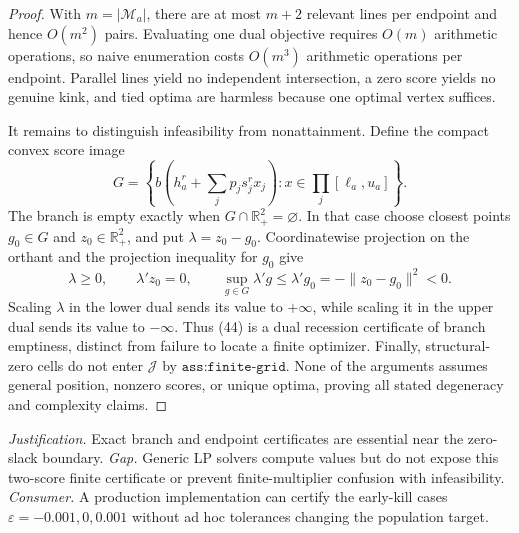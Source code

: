 \documentclass{article}
\begin{document}
\begin{proof}
With \(m=|\mathcal M_a|\), there are at most \(m+2\) relevant lines per endpoint and hence \(O(m^2)\) pairs.  Evaluating one dual objective requires \(O(m)\) arithmetic operations, so naive enumeration costs \(O(m^3)\) arithmetic operations per endpoint.  Parallel lines yield no independent intersection, a zero score yields no genuine kink, and tied optima are harmless because one optimal vertex suffices.

It remains to distinguish infeasibility from nonattainment.  Define the compact convex score image
\[
 G=\left\{b\left(h_a^r+\sum_jp_js_j^rx_j\right):
 x\in\prod_j[\ell_a,u_a]\right\}.
\]
The branch is empty exactly when \(G\cap\mathbb R_+^2=\varnothing\).  In that case choose closest points \(g_0\in G\) and \(z_0\in\mathbb R_+^2\), and put \(\lambda=z_0-g_0\).  Coordinatewise projection on the orthant and the projection inequality for \(g_0\) give
\[
 \lambda\ge0,\qquad \lambda'z_0=0,\qquad
 \sup_{g\in G}\lambda'g
 \le\lambda'g_0=-\|z_0-g_0\|^2<0.                                           \tag{44}
\]
Scaling \(\lambda\) in the lower dual sends its value to \(+\infty\), while scaling it in the upper dual sends its value to \(-\infty\).  Thus (44) is a dual recession certificate of branch emptiness, distinct from failure to locate a finite optimizer.  Finally, structural-zero cells do not enter \(\mathcal J\) by \(\texttt{ass:finite-grid}\).  None of the arguments assumes general position, nonzero scores, or unique optima, proving all stated degeneracy and complexity claims.
\end{proof}
\par\smallskip\noindent \textit{Justification.} Exact branch and endpoint certificates are essential near the zero-slack boundary. \textit{Gap.} Generic LP solvers compute values but do not expose this two-score finite certificate or prevent finite-multiplier confusion with infeasibility. \textit{Consumer.} A production implementation can certify the early-kill cases \(\varepsilon=-0.001,0,0.001\) without ad hoc tolerances changing the population target.
\end{document}
